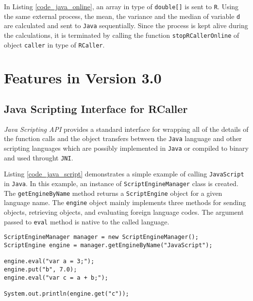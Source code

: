 \documentclass[10pt,a4paper, final, oneside]{article}
\begin{document}
In Listing \ref{code_java_online}, an array in type of \texttt{double[]} is sent to \texttt{R}. Using the same external process, the mean, the variance and the median of variable \texttt{d} are calculated and sent to \texttt{Java} sequentially. Since the process is kept alive during the calculations, it is terminated by calling the function \texttt{stopRCallerOnline} of object \texttt{caller} in type of \texttt{RCaller}.

\section{Features in Version 3.0}
\label{sec:features_in_version_3}

\subsection{Java Scripting Interface for RCaller}
\label{sec:javax_script_interface}
\emph{Java Scripting API} provides a standard interface for wrapping all of the details of the function calls and the object transfers between the \texttt{Java} language and other scripting languages which are possibly implemented in \texttt{Java} or compiled to binary and used throught \texttt{JNI}. 

Listing \ref{code_java_script} demonstrates a simple example of calling \texttt{JavaScript} in \texttt{Java}. In this example, an instance of \texttt{ScriptEngineManager} class is created. The \texttt{getEngineByName} method returns a \texttt{ScriptEngine} object for a given language name. The \texttt{engine} object mainly implements three methods for sending objects, retrieving objects, and evaluating foreign language codes. The argument passed to \texttt{eval} method is native to the called language. 


\begin{minipage}{\linewidth}
\begin{lstlisting}[caption=Calling JavaScript,label=code_java_script]
ScriptEngineManager manager = new ScriptEngineManager();
ScriptEngine engine = manager.getEngineByName("JavaScript");
        
engine.eval("var a = 3;");
engine.put("b", 7.0);
engine.eval("var c = a + b;");
        
System.out.println(engine.get("c"));
\end{lstlisting}
\end{minipage}
\end{document}
